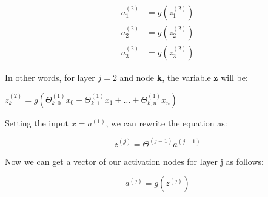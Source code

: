 \begin{align*}
a^{(2)}_1&=g\left(z^{(2)}_1  \right)\\
a^{(2)}_2&=g\left(z^{(2)}_2  \right)\\
a^{(2)}_3&=g\left(z^{(2)}_3  \right)
\end{align*}

In other words, for layer $ j=2 $ and node \textbf{k}, the variable \textbf{z} will be:

\begin{center}
$z^{(2)}_k=g\left(\Theta^{(1)}_{k,0}x_0+\Theta^{(1)}_{k,1}x_1+ \dots +\Theta^{(1)}_{k,n}x_n\right)$
\end{center}

Setting the input $ x = a^{(1)} $, we can rewrite the equation as:

\begin{equation}
z^{(j)} = \Theta^{(j-1)}  a^{(j-1)}  
\end{equation}

Now we can get a vector of our activation nodes for layer j as follows:

\begin{equation}
a^{(j)}  = g(z^{(j)})
\end{equation}